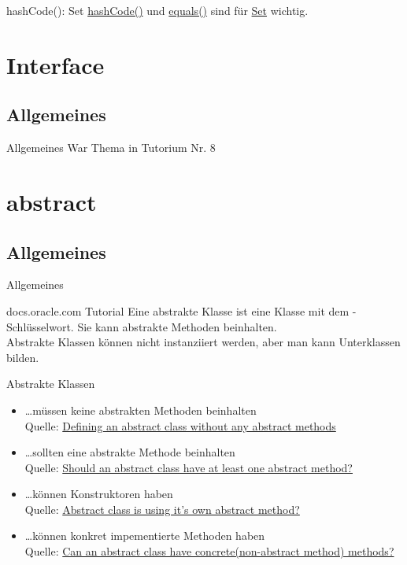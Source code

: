 \documentclass[usepdftitle=false,hyperref={pdfpagelabels=false}]{beamer}
\begin{document}
\begin{frame}{hashCode(): Set}
    \href{http://docs.oracle.com/javase/7/docs/api/java/lang/Object.html\#equals(java.lang.Object)}{hashCode()} und \href{http://docs.oracle.com/javase/7/docs/api/java/lang/Object.html\#equals(java.lang.Object)}{equals()} sind für \href{http://docs.oracle.com/javase/7/docs/api/java/util/Set.html}{Set} wichtig.
\end{frame}

\section{Interface}
\subsection{Allgemeines}
\begin{frame}{Allgemeines}
    War Thema in Tutorium Nr. 8
\end{frame}

\section{abstract}
\subsection{Allgemeines}
\begin{frame}{Allgemeines}
    \begin{block}{docs.oracle.com Tutorial}
        Eine abstrakte Klasse ist eine Klasse mit dem -Schlüsselwort.
        Sie kann abstrakte Methoden beinhalten.\\
        Abstrakte Klassen können nicht instanziiert werden, aber man kann
        Unterklassen bilden.
    \end{block}

    Abstrakte Klassen
    \begin{itemize}[<+->]
        \item \dots müssen keine abstrakten Methoden beinhalten\\
              {\tiny Quelle: \href{http://stackoverflow.com/q/4811678/562769}{Defining an abstract class without any abstract methods}}
        \item \dots sollten eine abstrakte Methode beinhalten\\
              {\tiny Quelle: \href{http://stackoverflow.com/q/2283399/562769}{Should an abstract class have at least one abstract method?}}
        \item \dots können Konstruktoren haben\\
              {\tiny Quelle: \href{http://stackoverflow.com/q/7644342/562769}{Abstract class is using it's own abstract method?}}
        \item \dots können konkret impementierte Methoden haben\\
              {\tiny Quelle: \href{http://answers.yahoo.com/question/index?qid=20111207141904AABXAvh}{Can an abstract class have concrete(non-abstract method) methods?}}
    \end{itemize}
\end{frame}
\end{document}
